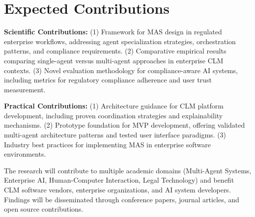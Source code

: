 
\chapter{Expected Contributions}\label{chapter:expected_contributions}

\textbf{Scientific Contributions:} (1) Framework for MAS design in regulated enterprise workflows, addressing agent specialization strategies, orchestration patterns, and compliance requirements. (2) Comparative empirical results comparing single-agent versus multi-agent approaches in enterprise CLM contexts. (3) Novel evaluation methodology for compliance-aware AI systems, including metrics for regulatory compliance adherence and user trust measurement.

\textbf{Practical Contributions:} (1) Architecture guidance for CLM platform development, including proven coordination strategies and explainability mechanisms. (2) Prototype foundation for MVP development, offering validated multi-agent architecture patterns and tested user interface paradigms. (3) Industry best practices for implementing MAS in enterprise software environments.

The research will contribute to multiple academic domains (Multi-Agent Systems, Enterprise AI, Human-Computer Interaction, Legal Technology) and benefit CLM software vendors, enterprise organizations, and AI system developers. Findings will be disseminated through conference papers, journal articles, and open source contributions.
